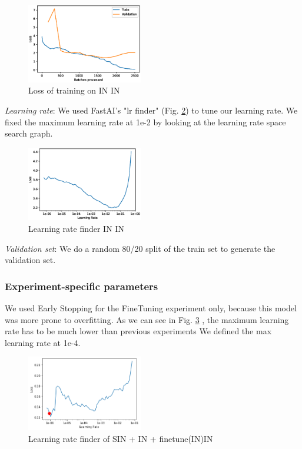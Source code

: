 \documentclass{article}
\begin{document}
 \begin{figure}[h!]
  \includegraphics[width = 0.45\textwidth]{imgs/sin/loss}
  \caption{Loss of training on IN \texorpdfstring{\textrightarrow} .IN}
  \label{loss_in}
\end{figure}

\textit{Learning rate}: We used FastAI's "lr finder" (Fig. \ref{lr_finder}) to tune our learning rate.
We fixed the maximum learning rate at 1e-2 by looking at the learning rate space search graph.
\begin{figure}[h!]
  \includegraphics[width = 0.45\textwidth]{imgs/lr_find.eps}
  \caption{Learning rate finder IN \texorpdfstring{\textrightarrow} .IN}
  \label{lr_finder}
\end{figure}

\textit{Validation set}: We do a random 80/20 split of the train set to generate the 
validation set.

\subsubsection{Experiment-specific parameters}
We used Early Stopping for the FineTuning experiment only, because this model was more prone to overfitting.
As we can see in Fig. \ref{lr_finetune} , the maximum learning rate has to be much lower than previous experiments 
We defined the max learning rate at 1e-4.

\begin{figure}[h!]
  \includegraphics[width = 0.45\textwidth]{imgs/lr_finetune.png}
  \caption{Learning rate finder of SIN + IN + finetune(IN)\texorpdfstring{\textrightarrow} .IN}
  \label{lr_finetune}
\end{figure}
\end{document}
